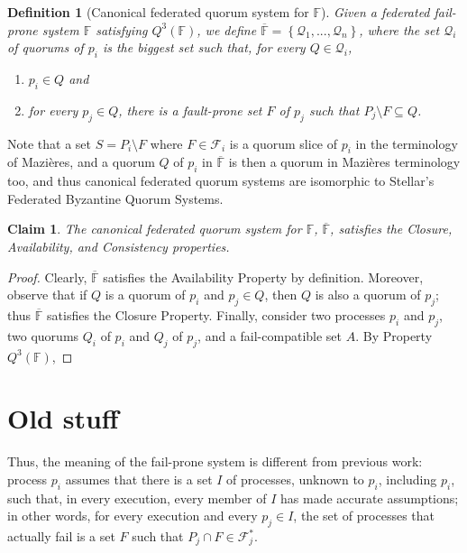 \documentclass[11pt]{article}
\newtheorem{definition}{Definition}
\newtheorem{claim}{Claim}
\begin{document}
\begin{definition}[Canonical federated quorum system for $\mathbb{F}$]
Given a federated fail-prone system $\mathbb{F}$ satisfying $Q^3(\mathbb{F})$, we define $\overline{\mathbb{F}}=\left\{\mathcal{Q}_1,...,\mathcal{Q}_n\right\}$, where the set $\mathcal{Q}_i$ of quorums of $p_i$ is the biggest set such that, for every $Q\in\mathcal{Q}_i$,
\begin{enumerate}
  \item $p_i\in Q$ and
  \item for every $p_j\in Q$, there is a fault-prone set $F$ of $p_j$ such that $P_j\setminus F\subseteq Q$.
\end{enumerate}
\end{definition}
Note that a set $S=P_i\setminus F$ where $F\in\mathcal{F}_i$ is a quorum slice of $p_i$ in the terminology of Mazières, and a quorum $Q$ of $p_i$ in $\overline{\mathbb{F}}$ is then a quorum in Mazières terminology too, and thus canonical federated quorum systems are isomorphic to Stellar's Federated Byzantine Quorum Systems.

\begin{claim}
 The canonical federated quorum system for $\mathbb{F}$, $\overline{\mathbb{F}}$, satisfies the Closure, Availability, and Consistency properties.
\end{claim}
\begin{proof}
  Clearly, $\overline{\mathbb{F}}$  satisfies the Availability Property by definition. Moreover, observe that if $Q$ is a quorum of $p_i$ and $p_j\in Q$, then $Q$ is also a quorum of $p_j$; thus $\overline{\mathbb{F}}$ satisfies the Closure Property. Finally, consider two processes $p_i$ and $p_j$, two quorums $Q_i$ of $p_i$ and $Q_j$ of $p_j$, and a fail-compatible set $A$. By Property $Q^3(\mathbb{F})$, 
\end{proof}

\section{Old stuff}


Thus, the meaning of the fail-prone system is different from previous work: process $p_i$ assumes that there is a set $I$ of processes, unknown to $p_i$, including $p_i$, such that, in every execution, every member of $I$ has made accurate assumptions; in other words, for every execution and every $p_j\in I$, the set of processes that actually fail is a set $F$ such that $P_j\cap F \in \mathcal{F}_j^*$.
\end{document}
